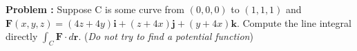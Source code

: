 {\bf Problem :} Suppose C is some curve from \(\left( 0, 0, 0 \right)\) to \(\left( 1, 1, 1
\right)\) and \(\mathbf{F} \left( x, y, z \right) = \left( 4 z + 4 y \right)
\mathbf{i} + \left( z + 4 x \right) \mathbf{j} + \left( y + 4 x \right)
\mathbf{k}\). Compute the line integral directly \(\int_{C} \mathbf{F} \cdot d\mathbf{r}\). ({\em Do not try to find a potential function})